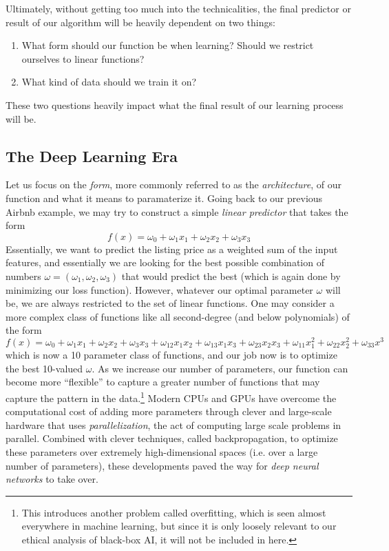 \documentclass[10pt]{article}
\begin{document}
    Ultimately, without getting too much into the technicalities, the final predictor or result of our algorithm will be heavily dependent on two things: 
    \begin{enumerate}
      \item What form should our function be when learning? Should we restrict ourselves to linear functions? 
      \item What kind of data should we train it on? 
    \end{enumerate}
    These two questions heavily impact what the final result of our learning process will be. 

  \subsection{The Deep Learning Era} 

    Let us focus on the \textit{form}, more commonly referred to as the \textit{architecture}, of our function and what it means to paramaterize it. Going back to our previous Airbnb example, we may try to construct a simple \textit{linear predictor} that takes the form 
    \begin{equation}
      f(x) = \omega_0 + \omega_1 x_1 + \omega_2 x_2 + \omega_3 x_3 
    \end{equation}
    Essentially, we want to predict the listing price as a weighted sum of the input features, and essentially we are looking for the best possible combination of numbers $\omega = (\omega_1, \omega_2, \omega_3)$ that would predict the best (which is again done by minimizing our loss function). However, whatever our optimal parameter $\omega$ will be, we are always restricted to the set of linear functions. One may consider a more complex class of functions like all second-degree (and below polynomials) of the form 
    \begin{equation}
      f(x) = \omega_0 + \omega_1 x_1 + \omega_2 x_2 + \omega_3 x_3 + \omega_{12} x_1 x_2 + \omega_{13} x_1 x_3 + \omega_{23} x_2 x_3 + \omega_{11} x_1^2 + \omega_{22} x_2^2 + \omega_{33} x^3
    \end{equation}
    which is now a 10 parameter class of functions, and our job now is to optimize the best 10-valued $\omega$. As we increase our number of parameters, our function can become more ``flexible'' to capture a greater number of functions that may capture the pattern in the data.\footnote{This introduces another problem called overfitting, which is seen almost everywhere in machine learning, but since it is only loosely relevant to our ethical analysis of black-box AI, it will not be included in here.} Modern CPUs and GPUs have overcome the computational cost of adding more parameters through clever and large-scale hardware that uses \textit{parallelization}, the act of computing large scale problems in parallel. Combined with clever techniques, called backpropagation, to optimize these parameters over extremely high-dimensional spaces (i.e. over a large number of parameters), these developments paved the way for \textit{deep neural networks} to take over. 
\end{document}
